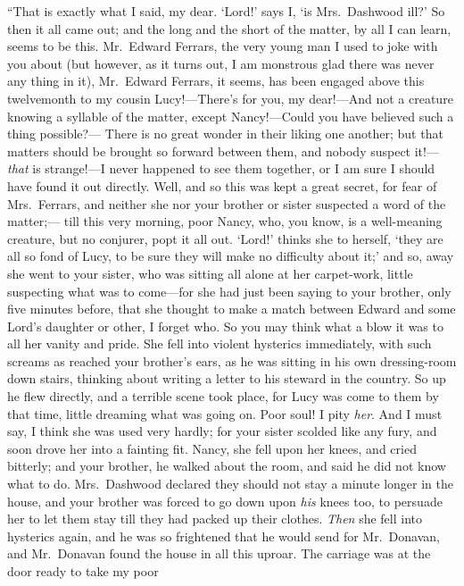 ``That is exactly what I said, my dear.  `Lord!' says I,
`is Mrs.\ Dashwood ill?' So then it all came out; and the
long and the short of the matter, by all I can learn,
seems to be this.  Mr.\ Edward Ferrars, the very young
man I used to joke with you about (but however, as it
turns out, I am monstrous glad there was never any thing
in it), Mr.\ Edward Ferrars, it seems, has been engaged
above this twelvemonth to my cousin Lucy!---There's for you,
my dear!---And not a creature knowing a syllable of the matter,
except Nancy!---Could you have believed such a thing possible?---%
There is no great wonder in their liking one another;
but that matters should be brought so forward between them,
and nobody suspect it!---\emph{that} is strange!---I never happened
to see them together, or I am sure I should have found it
out directly.  Well, and so this was kept a great secret,
for fear of Mrs.\ Ferrars, and neither she nor your
brother or sister suspected a word of the matter;---%
till this very morning, poor Nancy, who, you know, is a
well-meaning creature, but no conjurer, popt it all out.
`Lord!' thinks she to herself, `they are all so fond
of Lucy, to be sure they will make no difficulty about it;'
and so, away she went to your sister, who was sitting all
alone at her carpet-work, little suspecting what was to
come---for she had just been saying to your brother, only five
minutes before, that she thought to make a match between
Edward and some Lord's daughter or other, I forget who.
So you may think what a blow it was to all her vanity
and pride.  She fell into violent hysterics immediately,
with such screams as reached your brother's ears,
as he was sitting in his own dressing-room down stairs,
thinking about writing a letter to his steward in the country.
So up he flew directly, and a terrible scene took place,
for Lucy was come to them by that time, little dreaming
what was going on.  Poor soul!  I pity \emph{her}.  And I must say,
I think she was used very hardly; for your sister scolded
like any fury, and soon drove her into a fainting fit.
Nancy, she fell upon her knees, and cried bitterly;
and your brother, he walked about the room, and said
he did not know what to do.  Mrs.\ Dashwood declared
they should not stay a minute longer in the house,
and your brother was forced to go down upon \emph{his} knees too,
to persuade her to let them stay till they had packed
up their clothes.  \emph{Then} she fell into hysterics again,
and he was so frightened that he would send for Mr.\ Donavan,
and Mr.\ Donavan found the house in all this uproar.
The carriage was at the door ready to take my poor
